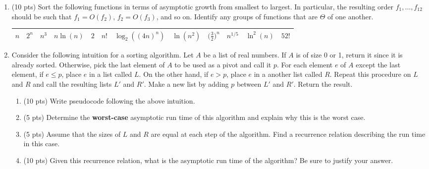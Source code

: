 \documentclass{article}
\begin{document}
\begin{enumerate}
    \item (10 pts) Sort the following functions in terms of asymptotic growth from smallest to largest. In particular, the resulting order $f_1, \dots, f_{12}$ should be such that $f_1 = O(f_2)$, $f_2 = O(f_3)$, and so on. Identify any groups of functions that are $\Theta$ of one another.
    \begin{center}
        \begin{tabular}{|c|c|c|c|c|c|c|c|c|c|c|c|}
            \hline
             $n$ & $2^n$ & $n^3$ & $n \ln(n)$ & $2$ & $n!$ & $\log_2((4n)^n)$ & $\ln(n^2)$ & $\big(\frac{3}{2}\big)^n$ & $n^{1/5}$ & $\ln^2(n)$ & $52!$ \\ \hline
        \end{tabular}
    \end{center}
    
    \item Consider the following intuition for a sorting algorithm. Let $A$ be a list of real numbers. If $A$ is of size 0 or 1, return it since it is already sorted. Otherwise, pick the last element of $A$ to be used as a pivot and call it $p$. For each element $e$ of $A$ except the last element, if $e \leq p$, place $e$ in a list called $L$. On the other hand, if $e>p$, place $e$ in a another list called $R$. Repeat this procedure on $L$ and $R$ and call the resulting lists $L'$ and $R'$. Make a new list by adding $p$ between $L'$ and $R'$. Return the result.
    \begin{enumerate}
        \item (10 pts) Write pseudocode following the above intuition.
        \item (5 pts) Determine the \textbf{worst-case} asymptotic run time of this algorithm and explain why this is the worst case.
        \item (5 pts) Assume that the sizes of $L$ and $R$ are equal at each step of the algorithm. Find a recurrence relation describing the run time in this case.
        \item (10 pts) Given this recurrence relation, what is the asymptotic run time of the algorithm? Be sure to justify your answer.
    \end{enumerate}
    
    \newpage 
    

\end{enumerate}
\end{document}
